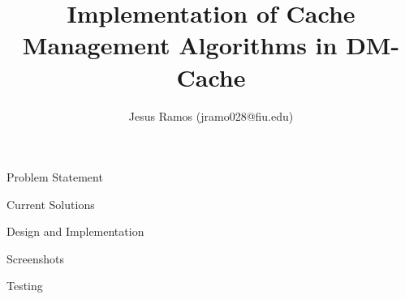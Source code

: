 \documentclass[final]{beamer}
\title{Implementation of Cache Management Algorithms in DM-Cache}
\author{Jesus Ramos (jramo028@fiu.edu)}
\institute[FIU]{Florida International University}
\date{}
\begin{document}
\begin{frame}{}

  \begin{block}{\large Problem Statement}
  \end{block}

  \begin{block}{\large Current Solutions}
  \end{block}

  \begin{block}{\large Design and Implementation}
  \end{block}

  \begin{block}{\large Screenshots}
  \end{block}

  \begin{block}{\large Testing}
  \end{block}

\end{frame}
\end{document}
